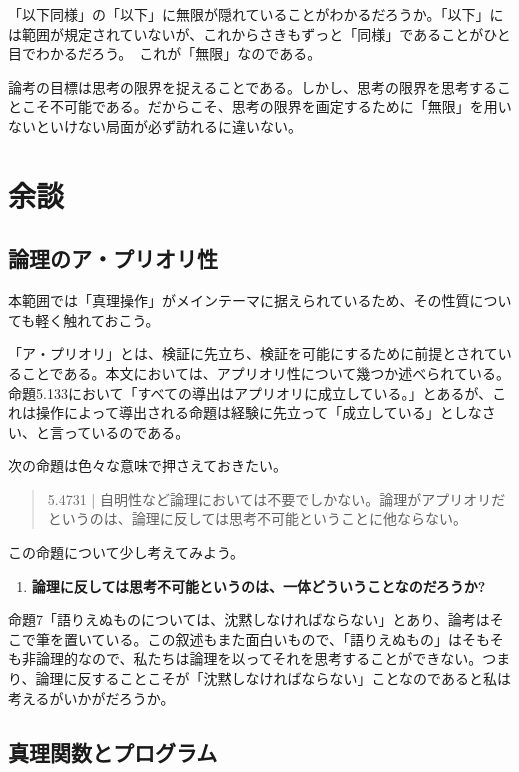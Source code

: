 \documentclass[a4paper,onecolumn,article]{jarticle}
\newcounter{ct}               %
\begin{document}
「以下同様」の「以下」に無限が隠れていることがわかるだろうか。「以下」には範囲が規定されていないが、これからさきもずっと「同様」であることがひと目でわかるだろう。 これが「無限」なのである。

論考の目標は思考の限界を捉えることである。しかし、思考の限界を思考することこそ不可能である。だからこそ、思考の限界を画定するために「無限」を用いないといけない局面が必ず訪れるに違いない。

\section{余談}

\subsection{論理のア・プリオリ性}

本範囲では「真理操作」がメインテーマに据えられているため、その性質についても軽く触れておこう。

「ア・プリオリ」とは、検証に先立ち、検証を可能にするために前提とされていることである。本文においては、アプリオリ性について幾つか述べられている。命題5.133において「すべての導出はアプリオリに成立している。」とあるが、これは操作によって導出される命題は経験に先立って「成立している」としなさい、と言っているのである。

次の命題は色々な意味で押さえておきたい。
\begin{quote}

  5.4731 | 自明性など論理においては不要でしかない。論理がアプリオリだというのは、論理に反しては思考不可能ということに他ならない。

\end{quote}

この命題について少し考えてみよう。
\begin{enumerate}
  \item {\bf 論理に反しては思考不可能というのは、一体どういうことなのだろうか? }
\end{enumerate}

命題7「語りえぬものについては、沈黙しなければならない」とあり、論考はそこで筆を置いている。この叙述もまた面白いもので、「語りえぬもの」はそもそも非論理的なので、私たちは論理を以ってそれを思考することができない。つまり、論理に反することこそが「沈黙しなければならない」ことなのであると私は考えるがいかがだろうか。

\subsection{真理関数とプログラム}
\end{document}
